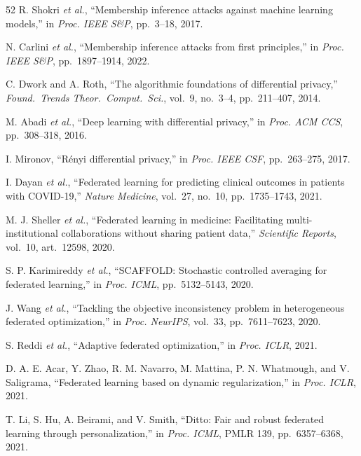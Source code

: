\documentclass[conference,a4paper]{IEEEtran}
\begin{document}
\begin{thebibliography}{52}
R. Shokri \textit{et al.}, ``Membership inference attacks against machine learning models,'' in \textit{Proc. IEEE S\&P}, pp.~3--18, 2017.

N. Carlini \textit{et al.}, ``Membership inference attacks from first principles,'' in \textit{Proc. IEEE S\&P}, pp.~1897--1914, 2022.

C. Dwork and A. Roth, ``The algorithmic foundations of differential privacy,'' \textit{Found.~Trends Theor.~Comput.~Sci.}, vol.~9, no.~3--4, pp.~211--407, 2014.

M. Abadi \textit{et al.}, ``Deep learning with differential privacy,'' in \textit{Proc. ACM CCS}, pp.~308--318, 2016.

I. Mironov, ``R\'enyi differential privacy,'' in \textit{Proc. IEEE CSF}, pp.~263--275, 2017.

I. Dayan \textit{et al.}, ``Federated learning for predicting clinical outcomes in patients with COVID-19,'' \textit{Nature Medicine}, vol.~27, no.~10, pp.~1735--1743, 2021.

M. J. Sheller \textit{et al.}, ``Federated learning in medicine: Facilitating multi-institutional collaborations without sharing patient data,'' \textit{Scientific Reports}, vol.~10, art.~12598, 2020.

S. P. Karimireddy \textit{et al.}, ``SCAFFOLD: Stochastic controlled averaging for federated learning,'' in \textit{Proc. ICML}, pp.~5132--5143, 2020.

J. Wang \textit{et al.}, ``Tackling the objective inconsistency problem in heterogeneous federated optimization,'' in \textit{Proc. NeurIPS}, vol.~33, pp.~7611--7623, 2020.

S. Reddi \textit{et al.}, ``Adaptive federated optimization,'' in \textit{Proc. ICLR}, 2021.

D. A. E. Acar, Y. Zhao, R. M. Navarro, M. Mattina, P. N. Whatmough, and V. Saligrama, ``Federated learning based on dynamic regularization,'' in \textit{Proc. ICLR}, 2021.

T. Li, S. Hu, A. Beirami, and V. Smith, ``Ditto: Fair and robust federated learning through personalization,'' in \textit{Proc. ICML}, PMLR 139, pp.~6357--6368, 2021.


\end{thebibliography}
\end{document}
